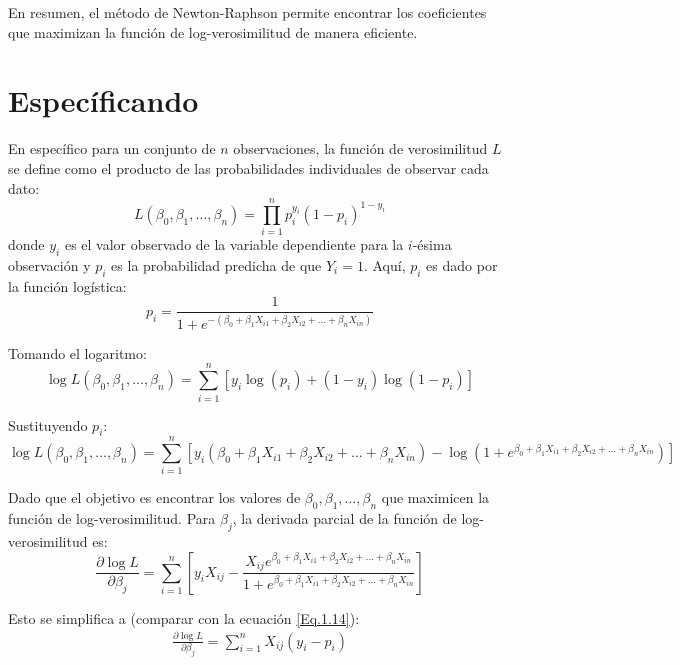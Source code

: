\documentclass[a4paper]{report} %
\begin{document}
En resumen, el método de Newton-Raphson permite encontrar los coeficientes que maximizan la función de log-verosimilitud de manera eficiente. 

\section{Espec\'ificando}
En espec\'ifico para un conjunto de $n$ observaciones, la función de verosimilitud $L$ se define como el producto de las probabilidades individuales de observar cada dato:
\begin{equation}
L(\beta_0, \beta_1, \ldots, \beta_n) = \prod_{i=1}^{n} p_i^{y_i} (1 - p_i)^{1 - y_i}
\end{equation}
donde $y_i$ es el valor observado de la variable dependiente para la $i$-ésima observación y $p_i$ es la probabilidad predicha de que $Y_i = 1$. Aquí, $p_i$ es dado por la función logística:
\begin{equation}
p_i = \frac{1}{1 + e^{-(\beta_0 + \beta_1 X_{i1} + \beta_2 X_{i2} + \ldots + \beta_n X_{in})}}
\end{equation}

Tomando el logaritmo:
\begin{equation}
\log L(\beta_0, \beta_1, \ldots, \beta_n) = \sum_{i=1}^{n} \left[ y_i \log(p_i) + (1 - y_i) \log(1 - p_i) \right]
\end{equation}

Sustituyendo $p_i$:
\begin{equation}
\log L(\beta_0, \beta_1, \ldots, \beta_n) = \sum_{i=1}^{n} \left[ y_i (\beta_0 + \beta_1 X_{i1} + \beta_2 X_{i2} + \ldots + \beta_n X_{in}) - \log(1 + e^{\beta_0 + \beta_1 X_{i1} + \beta_2 X_{i2} + \ldots + \beta_n X_{in}}) \right]
\end{equation}

Dado que el objetivo es encontrar los valores de $\beta_0, \beta_1, \ldots, \beta_n$ que maximicen la función de log-verosimilitud.  Para $\beta_j$, la derivada parcial de la función de log-verosimilitud es:
\begin{equation}
\frac{\partial \log L}{\partial \beta_j} = \sum_{i=1}^{n} \left[ y_i X_{ij} - \frac{X_{ij} e^{\beta_0 + \beta_1 X_{i1} + \beta_2 X_{i2} + \ldots + \beta_n X_{in}}}{1 + e^{\beta_0 + \beta_1 X_{i1} + \beta_2 X_{i2} + \ldots + \beta_n X_{in}}} \right]
\end{equation}

Esto se simplifica a (comparar con la ecuaci\'on \ref{Eq.1.14}):
\begin{eqnarray}\label{Eq.1.25}
\frac{\partial \log L}{\partial \beta_j} = \sum_{i=1}^{n} X_{ij} (y_i - p_i)
\end{eqnarray}
\end{document}
